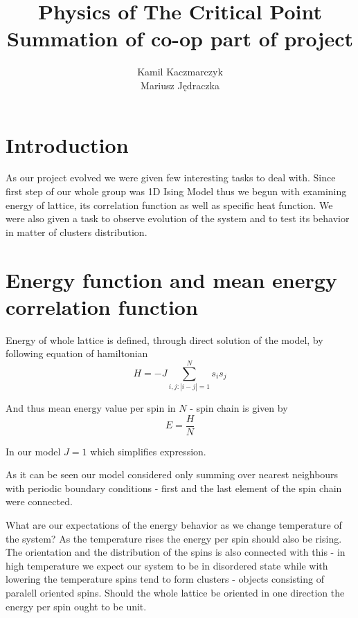 \documentclass[a4paper,12pt,titlepage]{article}
\title{Physics of The Critical Point\\\small Summation of co-op part of project}
\author{Kamil Kaczmarczyk \\ Mariusz Jędraczka}
\begin{document}
  \maketitle
  \section{Introduction}
  As our project evolved we were given few interesting tasks to deal with. Since first step of our whole group was 1D Ising Model thus
  we begun with examining energy of lattice, its correlation function as well as specific heat function. We were also given a task to 
  observe evolution of the system and to test its behavior in matter of clusters distribution.
  \section{Energy function and mean energy correlation function}
  Energy of whole lattice is defined, through direct solution of the model, by following equation of hamiltonian
  \begin{equation}
    H=-J\sum_{i,j:|i-j|=1}^{N}{s_is_j}
  \end{equation}
 
  And thus mean energy value per spin in $N$ - spin chain is given by
  \begin{equation}
    E=\frac{H}{N}
  \end{equation}

  In our model $J=1$ which simplifies expression.
  
  As it can be seen our model considered only summing over nearest neighbours with periodic boundary conditions - first and the last element
  of the spin chain were connected.
  
  What are our expectations of the energy behavior as we change temperature of the system? As the temperature rises the energy per spin
  should also be rising. The orientation and the distribution of the spins is also connected with this - in high temperature we expect our system
  to be in disordered state while with lowering the temperature spins tend to form clusters - objects consisting of paralell oriented spins.
  Should the whole lattice be oriented in one direction the energy per spin ought to be unit.
  
\end{document}
